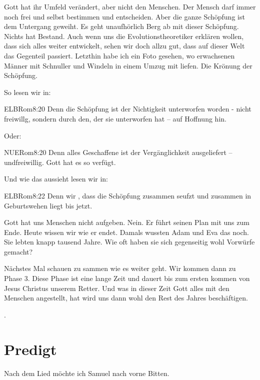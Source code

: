 \documentclass{../../inc/mybib}
\begin{document}
\begin{spacing}{1.5}
\begin{block}[ABER]
        Gott hat ihr Umfeld verändert, aber nicht den Menschen. Der Mensch darf immer noch frei und selbst bestimmen und entscheiden.  Aber die ganze Schöpfung ist dem Untergang geweiht. Es geht unaufhörlich Berg ab mit dieser Schöpfung. Nichts hat Bestand. Auch wenn uns die Evolutionstheoretiker erklären wollen, dass sich alles weiter entwickelt, sehen wir doch allzu gut, dass auf dieser Welt das Gegenteil passiert. Letzthin habe ich ein Foto gesehen, wo erwachsenen Männer mit Schnuller und Windeln in einem Umzug mit liefen. Die Krönung der Schöpfung.

        So lesen wir in:
        \begin{bibelbox}{ELB}{Rom}{8:20}
            Denn die Schöpfung ist der Nichtigkeit unterworfen worden - nicht freiwillg, sondern durch den, der sie unterworfen hat -- auf Hoffnung hin.
        \end{bibelbox}
        Oder:
        \begin{bibelbox}{NUE}{Rom}{8:20}
            Denn alles Geschaffene ist der Vergänglichkeit ausgeliefert -- undfreiwillig. Gott hat es so verfügt.
        \end{bibelbox}
        Und wie das aussieht lesen wir in:
        \begin{bibelbox}{ELB}{Rom}{8:22}
            Denn wir , dass die  Schöpfung zusammen seufzt und zusammen in Geburtswehen liegt bis jetzt.
        \end{bibelbox}
    \end{block}
    \begin{block}
        Gott hat uns Menschen nicht aufgeben. Nein. Er führt seinen Plan mit uns zum Ende. Heute wissen wir wie er endet. Damals wussten Adam und Eva das noch. Sie lebten knapp tausend Jahre. Wie oft haben sie sich gegenseitig wohl Vorwürfe gemacht?
    \end{block}
    \begin{block}
        Nächstes Mal schauen zu sammen wie es weiter geht. Wir kommen dann zu Phase 3. Diese Phase ist eine lange Zeit und dauert bis zum ersten kommen von Jesus Christus unserem Retter. Und was in dieser Zeit Gott alles mit den Menschen angestellt, hat wird uns dann wohl den Rest des Jahres beschäftigen.
    \end{block}    
    
\end{spacing}
.

\section{Predigt}
Nach dem Lied möchte ich Samuel nach vorne Bitten.
\end{document}
